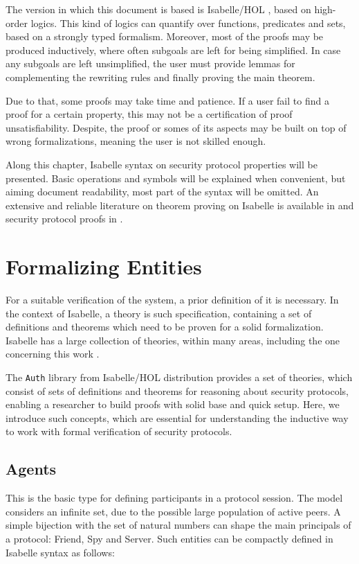The version in which this document is based is Isabelle/HOL \cite{isabelle-hol}, based on high-order logics. This kind of logics can quantify over functions, predicates and sets, based on a strongly typed formalism. Moreover, most of the proofs may be produced inductively, where often subgoals are left for being simplified. In case any subgoals are left unsimplified, the user must provide lemmas for complementing the rewriting rules and finally proving the main theorem.

Due to that, some proofs may take time and patience. If a user fail to find a proof for a certain property, this may not be a certification of proof unsatisfiability. Despite, the proof or somes of its aspects may be built on top of wrong formalizations, meaning the user is not skilled enough.

Along this chapter, Isabelle syntax on security protocol properties will be presented. Basic operations and symbols will be explained when convenient, but aiming document readability, most part of the syntax will be omitted. An extensive and reliable literature on theorem proving on Isabelle is available in \cite{isabelle-hol} and security protocol proofs in \cite{bella-book}.



\section{Formalizing Entities}
For a suitable verification of the system, a prior definition of it is necessary. In the context of Isabelle, a theory is such specification, containing a set of definitions and theorems which need to be proven for a solid formalization. Isabelle has a large collection of theories, within many areas, including the one concerning this work \cite{isabelle-hol-auth}.

The \texttt{Auth} library from Isabelle/HOL distribution \cite{isabelle-hol-auth} provides a set of theories, which consist of sets of definitions and theorems for reasoning about security protocols, enabling a researcher to build proofs with solid base and quick setup. Here, we introduce such concepts, which are essential for understanding the inductive way to work with formal verification of security protocols.

\subsection{Agents}
This is the basic type for defining participants in a protocol session. The model considers an infinite set, due to the possible large population of active peers. A simple bijection with the set of natural numbers can shape the main principals of a protocol: Friend, Spy and Server. Such entities can be compactly defined in Isabelle syntax as follows:

